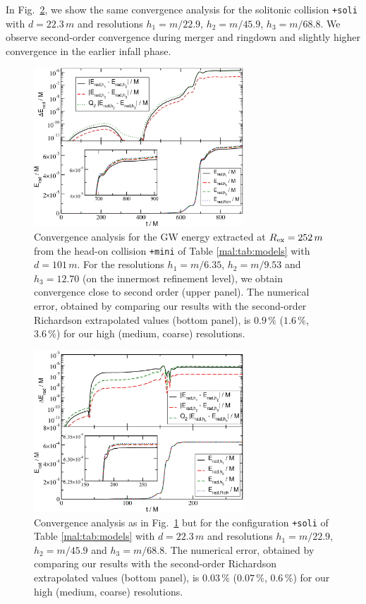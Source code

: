 In Fig.~\ref{mal:fig:conv_tsBS_Erad}, we show the same
convergence analysis for the solitonic collision
{\tt +soli} with $d=22.3\,m$ and resolutions
$h_1=m/22.9$, $h_2=m/45.9$, $h_3=m/68.8$. We observe
second-order convergence during merger and ringdown and
slightly higher convergence in the earlier infall phase.
%
\begin{figure}[t]
    \centering
    \includegraphics[width=0.7\textwidth]{malaise_source/conv_tmBS_Erad.pdf}
    \caption{
    Convergence analysis for the GW energy extracted at
    $R_{\rm ex}=252\,m$ from the head-on collision
    {\tt +mini} of Table \ref{mal:tab:models} with
    $d=101\,m$. For the resolutions
    $h_1=m/6.35$, $h_2=m/9.53$ and $h_3=12.70$
    (on the innermost refinement level),
    we obtain convergence close to second order
    (upper panel). The numerical error,
    obtained by comparing our results
    with the second-order Richardson extrapolated values
    (bottom panel), is $0.9\,\%$ ($1.6\,\%$, $3.6\,\%$) for
    our high (medium, coarse) resolutions.
    }
    \label{mal:fig:conv_tmBS_Erad}
\end{figure}
%
%
\begin{figure}[t]
    \centering
    \includegraphics[width=0.7\textwidth]{malaise_source/conv_tsBS_Erad.pdf}
    \caption{Convergence analysis as in
    Fig.~\ref{mal:fig:conv_tmBS_Erad} but for the configuration
    {\tt +soli} of Table \ref{mal:tab:models} with
    $d=22.3\,m$ and
    resolutions $h_1=m/22.9$, $h_2=m/45.9$ and $h_3=m/68.8$.
    The numerical error,
    obtained by comparing our results
    with the second-order Richardson extrapolated values
    (bottom panel),
    is $0.03\,\%$ ($0.07\,\%$, $0.6\,\%$) for
    our high (medium, coarse) resolutions.
    }
    \label{mal:fig:conv_tsBS_Erad}
\end{figure}
